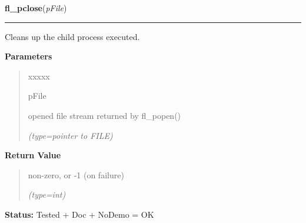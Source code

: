     \vspace{0.5ex}

\hspace{.8\funcindent}\begin{boxedminipage}{\funcwidth}

    \raggedright \textbf{fl\_pclose}(\textit{pFile})

    \vspace{-1.5ex}

    \rule{\textwidth}{0.5\fboxrule}
\setlength{\parskip}{2ex}
    Cleans up the child process executed.

\setlength{\parskip}{1ex}
      \textbf{Parameters}
      \vspace{-1ex}

      \begin{quote}
        \begin{Ventry}{xxxxx}

          \item[pFile]

          opened file stream returned by fl\_popen()

            {\it (type=pointer to FILE)}

        \end{Ventry}

      \end{quote}

      \textbf{Return Value}
    \vspace{-1ex}

      \begin{quote}
      non-zero, or -1 (on failure)

      {\it (type=int)}

      \end{quote}

\textbf{Status:} Tested + Doc + NoDemo = OK



    \end{boxedminipage}

    \label{xformslib:flgoodies:fl_end_all_command}

    \vspace{0.5ex}

